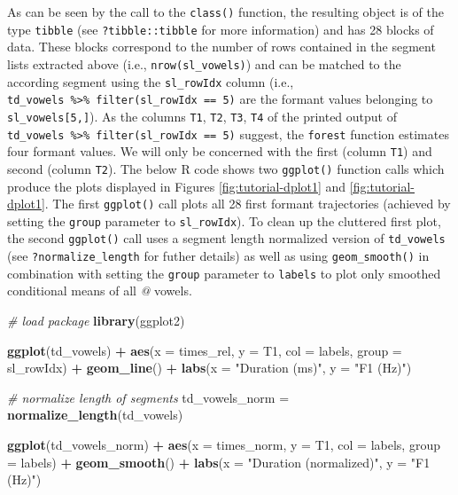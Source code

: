 \documentclass[]{book}
\newenvironment{Shaded}{\begin{snugshade}}{\end{snugshade}}
\newcommand{\CommentTok}[1]{\textcolor[rgb]{0.56,0.35,0.01}{\textit{#1}}}
\newcommand{\DataTypeTok}[1]{\textcolor[rgb]{0.13,0.29,0.53}{#1}}
\newcommand{\KeywordTok}[1]{\textcolor[rgb]{0.13,0.29,0.53}{\textbf{#1}}}
\newcommand{\NormalTok}[1]{#1}
\newcommand{\OperatorTok}[1]{\textcolor[rgb]{0.81,0.36,0.00}{\textbf{#1}}}
\newcommand{\StringTok}[1]{\textcolor[rgb]{0.31,0.60,0.02}{#1}}
\begin{document}
As can be seen by the call to the \texttt{class()} function, the resulting object is of the type \texttt{tibble} (see \texttt{?tibble::tibble} for more information) and has 28 blocks of data. These blocks correspond to the number of rows contained in the segment lists extracted above (i.e., \texttt{nrow(sl\_vowels)}) and can be matched to the according segment using the \texttt{sl\_rowIdx} column (i.e., \texttt{td\_vowels\ \%\textgreater{}\%\ filter(sl\_rowIdx\ ==\ 5)} are the formant values belonging to \texttt{sl\_vowels{[}5,{]}}). As the columns \texttt{T1}, \texttt{T2}, \texttt{T3}, \texttt{T4} of the printed output of \texttt{td\_vowels\ \%\textgreater{}\%\ filter(sl\_rowIdx\ ==\ 5)} suggest, the \texttt{forest} function estimates four formant values. We will only be concerned with the first (column \texttt{T1}) and second (column \texttt{T2}). The below R code shows two \texttt{ggplot()} function calls which produce the plots displayed in Figures \ref{fig:tutorial-dplot1} and \ref{fig:tutorial-dplot1}. The first \texttt{ggplot()} call plots all 28 first formant trajectories (achieved by setting the \texttt{group} parameter to \texttt{sl\_rowIdx}). To clean up the cluttered first plot, the second \texttt{ggplot()} call uses a segment length normalized version of \texttt{td\_vowels} (see \texttt{?normalize\_length} for futher details) as well as using \texttt{geom\_smooth()} in combination with setting the \texttt{group} parameter to \texttt{labels} to plot only smoothed conditional means of all \emph{@} vowels.

\begin{Shaded}
\begin{Highlighting}[]
\CommentTok{# load package}
\KeywordTok{library}\NormalTok{(ggplot2)}

\KeywordTok{ggplot}\NormalTok{(td_vowels) }\OperatorTok{+}
\StringTok{  }\KeywordTok{aes}\NormalTok{(}\DataTypeTok{x =}\NormalTok{ times_rel, }\DataTypeTok{y =}\NormalTok{ T1, }\DataTypeTok{col =}\NormalTok{ labels, }\DataTypeTok{group =}\NormalTok{ sl_rowIdx) }\OperatorTok{+}
\StringTok{  }\KeywordTok{geom_line}\NormalTok{() }\OperatorTok{+}
\StringTok{  }\KeywordTok{labs}\NormalTok{(}\DataTypeTok{x =} \StringTok{"Duration (ms)"}\NormalTok{, }\DataTypeTok{y =} \StringTok{"F1 (Hz)"}\NormalTok{)}

\CommentTok{# normalize length of segments}
\NormalTok{td_vowels_norm =}\StringTok{ }\KeywordTok{normalize_length}\NormalTok{(td_vowels)}

\KeywordTok{ggplot}\NormalTok{(td_vowels_norm) }\OperatorTok{+}
\StringTok{  }\KeywordTok{aes}\NormalTok{(}\DataTypeTok{x =}\NormalTok{ times_norm, }\DataTypeTok{y =}\NormalTok{ T1, }\DataTypeTok{col =}\NormalTok{ labels, }\DataTypeTok{group =}\NormalTok{ labels) }\OperatorTok{+}
\StringTok{  }\KeywordTok{geom_smooth}\NormalTok{() }\OperatorTok{+}
\StringTok{  }\KeywordTok{labs}\NormalTok{(}\DataTypeTok{x =} \StringTok{"Duration (normalized)"}\NormalTok{, }\DataTypeTok{y =} \StringTok{"F1 (Hz)"}\NormalTok{) }
\end{Highlighting}
\end{Shaded}
\end{document}
